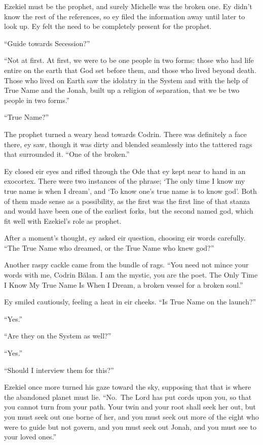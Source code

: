 Ezekiel must be the prophet, and surely Michelle was the broken one. Ey didn't know the rest of the references, so ey filed the information away until later to look up. Ey felt the need to be completely present for the prophet.

``Guide towards Secession?''

``Not at first. At first, we were to be one people in two forms: those who had life entire on the earth that God set before them, and those who lived beyond death. Those who lived on Earth saw the idolatry in the System and with the help of True Name and the Jonah, built up a religion of separation, that we be two people in two forms.''

``True Name?''

The prophet turned a weary head towards Codrin. There was definitely a face there, ey saw, though it was dirty and blended seamlessly into the tattered rags that surrounded it. ``One of the broken.''

Ey closed eir eyes and rifled through the Ode that ey kept near to hand in an exocortex. There were two instances of the phrase; `The only time I know my true name is when I dream', and `To know one's true name is to know god'. Both of them made sense as a possibility, as the first was the first line of that stanza and would have been one of the earliest forks, but the second named god, which fit well with Ezekiel's role as prophet.

After a moment's thought, ey asked eir question, choosing eir words carefully. ``The True Name who dreamed, or the True Name who knew god?''

Another raspy cackle came from the bundle of rags. ``You need not mince your words with me, Codrin Bălan. I am the mystic, you are the poet. The Only Time I Know My True Name Is When I Dream, a broken vessel for a broken soul.''

Ey smiled cautiously, feeling a heat in eir cheeks. ``Is True Name on the launch?''

``Yes.''

``Are they on the System as well?''

``Yes.''

``Should I interview them for this?''

Ezekiel once more turned his gaze toward the sky, supposing that that is where the abandoned planet must lie. ``No.~The Lord has put cords upon you, so that you cannot turn from your path. Your twin and your root shall seek her out, but you must seek out one borne of her, and you must seek out more of the eight who were to guide but not govern, and you must seek out Jonah, and you must see to your loved ones.''

